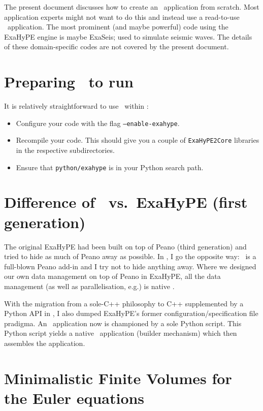 The present document discusses how to create an \ExaHyPE\ application from
scratch.
Most application experts might not want to do this and instead use a read-to-use
\ExaHyPE\ application.
The most prominent (and maybe powerful) code using the ExaHyPE engine is maybe
ExaSeis; used to simulate seismic waves.
The details of these domain-specific codes are not covered by the present
document.



\section*{Preparing \Peano\ to run \ExaHyPE}

It is relatively straightforward to use \ExaHyPE\ within \Peano:

\begin{itemize}
  \item Configure your code with the flag \texttt{--enable-exahype}.
  \item Recompile your code. This should give you a couple of
  \texttt{ExaHyPE2Core} libraries in the respective subdirectories.
  \item Ensure that \texttt{python/exahype} is in your Python search path.
\end{itemize}


\section*{Difference of \ExaHyPE\ vs.~ExaHyPE (first generation)}

The original ExaHyPE had been built on top of Peano (third generation) and tried
to hide as much of Peano away as possible.
In \ExaHyPE, I go the opposite way: \ExaHyPE\ is a full-blown Peano add-in and I
try not to hide anything away.
Where we designed our own data management on top of Peano in ExaHyPE, all the
data management (as well as parallelisation, e.g.) is native \Peano.


With the migration from a sole-C++ philosophy to C++ supplemented by a Python
API in \Peano, I also dumped ExaHyPE's former configuration/specification file
pradigma.
An \ExaHyPE\ application now is championed by a sole Python script.
This Python script yields a native \Peano\ application (builder mechanism) which
then assembles the application.



\section{Minimalistic Finite Volumes for the Euler equations}
\label{section:exahype:fv}


